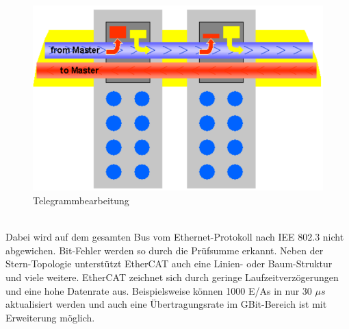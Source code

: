 \documentclass[ a4paper,
                oneside,
                toc=bibliography,
                toc=listof
                ]{scrbook}
\begin{document}
	\begin{figure}[!ht]
		\centering
		\includegraphics[width=0.7\linewidth]{./images/EtherCAT.png}
		\caption{Telegrammbearbeitung \cite{ethercat}}
		\label{fig:EtherCAT}
	\end{figure}\\
	Dabei wird auf dem gesamten Bus vom Ethernet-Protokoll nach IEE 802.3 nicht abgewichen. Bit-Fehler werden so durch die Prüfsumme erkannt. Neben der Stern-Topologie unterstützt EtherCAT auch eine Linien- oder Baum-Struktur und viele weitere.
	EtherCAT zeichnet sich durch geringe Laufzeitverzögerungen und eine hohe Datenrate aus. Beispielsweise können 1000 E/As in nur 30 \(\mu s\) aktualisiert werden und auch eine Übertragungsrate im GBit-Bereich ist mit Erweiterung möglich. \cite{ethercat}\\
	
	
\end{document}
